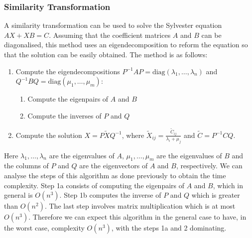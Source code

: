 \documentclass[11pt]{article}
\numberwithin{equation}{section}
\begin{document}
\subsubsection{Similarity Transformation}
A similarity transformation \cite{Simoncini} can be used to solve the Sylvester equation $AX + XB = C$. Assuming that the coefficient matrices $A$ and $B$ can be diagonalised, this method uses an eigendecomposition to reform the equation so that the solution can be easily obtained. The method is as follows:
\begin{enumerate}
\item Compute the eigendecompositions $P^{-1}AP = \text{diag}(\lambda_1, \dots, \lambda_n)$ and $Q^{-1}BQ = \text{diag}(\mu_1, \dots, \mu_m)$:
	\begin{enumerate}
	\item Compute the eigenpairs of $A$ and $B$
	\item Compute the inverses of $P$ and $Q$
	\end{enumerate}
\item Compute the solution $X = P \widetilde{X} Q^{-1}$, where $\widetilde{X}_{ij} = \frac{\widetilde{C}_{ij}}{\lambda_i + \mu_j}$ and $\widetilde{C} = P^{-1}CQ$.
\end{enumerate}
Here $\lambda_1, \dots, \lambda_n$ are the eigenvalues of $A$, $\mu_1, \dots, \mu_m$ are the eigenvalues of $B$ and the columns of $P$ and $Q$ are the eigenvectors of $A$ and $B$, respectively. We can analyse the steps of this algorithm as done previously to obtain the time complexity. Step 1a consists of computing the eigenpairs of $A$ and $B$, which in general is $O(n^3)$. Step 1b computes the inverse of $P$ and $Q$ which is greater than $O(n^2)$. The last step involves matrix multiplication which is at most $O(n^3)$. Therefore we can expect this algorithm in the general case to have, in the worst case, complexity $O(n^3)$, with the steps 1a and 2 dominating. 
\end{document}
